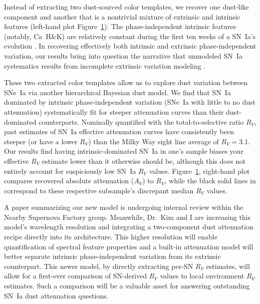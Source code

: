 \documentclass[modern]{aastex631}
\begin{document}
Instead of extracting two dust-sourced color templates, we recover one dust-like component and another that is a nontrivial mixture of extrinsic and intrinsic features (left-hand plot Figure~\ref{fig:fig1}). 
The phase-independent intrinsic features (notably, Ca~H\&K) are relatively constant during the first ten weeks of a SN~Ia's evolution \citep{Branch1993}.
In recovering effectively both intrinsic and extrinsic phase-independent variation, our results bring into question the narrative that unmodeled SN~Ia systematics results from incomplete extrinsic variation modeling \citep{Brout2019}. 

These two extracted color templates allow us to explore dust variation between SNe~Ia via another hierarchical Bayesian dust model. 
We find that SN~Ia dominated by intrinsic phase-independent variation (SNe~Ia with little to no dust attenuation) systematically fit for steeper attenuation curves than their dust-dominated counterparts. 
Nominally quantified with the total-to-selective ratio $R_V$, past estimates of SN~Ia effective attenuation curves have consistently been steeper (or have a lower $R_V$) than the Milky Way sight line average of $R_V=3.1$.
Our results find having intrinsic-dominated SN~Ia in one's sample biases your effective $R_V$ estimate lower than it otherwise should be, although this does not entirely account for suspiciously low SN~Ia $R_V$ values. 
Figure~\ref{fig:fig1}, right-hand plot compares recovered absolute attenuation ($A_V$) to $R_V$, while the black solid lines in correspond to these respective subsample's discrepant median $R_V$ values. 
\begin{figure}
    \caption{}
    \label{fig:fig1}
\end{figure}

A paper summarizing our new model is undergoing internal review within the Nearby Supernova Factory group. 
Meanwhile, Dr.\ Kim and I are increasing this model's wavelength resolution and integrating a two-component dust attenuation recipe directly into its architecture.  
This higher resolution will enable quantification of spectral feature properties and a built-in attenuation model will better separate intrinsic phase-independent variation from its extrinsic counterpart. 
This newer model, by directly extracting per-SN $R_V$ estimates, will allow for a first-ever comparison of SN-derived $R_V$ values to local environment $R_V$ estimates.
Such a comparison will be a valuable asset for answering outstanding SN~Ia dust attenuation questions.
\end{document}
